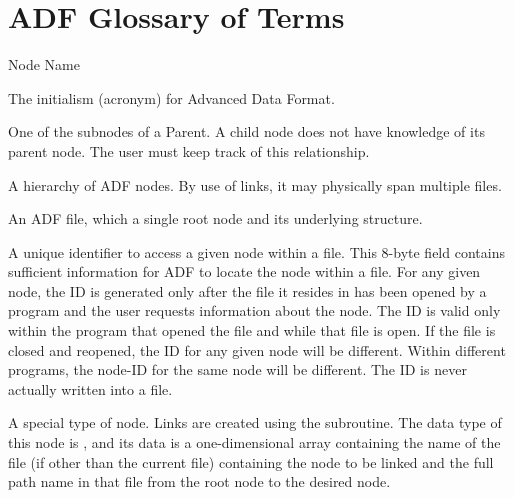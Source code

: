 \section{ADF Glossary of Terms}
\label{s:glossary}
\thispagestyle{plain}

\begin{Ventryi}{Node Name}
\item [ADF]
      The initialism (acronym) for Advanced Data Format.
\item [Child]
      One of the subnodes of a Parent.
      A child node does not have knowledge of its parent node.
      The user must keep track of this relationship.
\item [Database]
      A hierarchy of ADF nodes.
      By use of links, it may physically span multiple files.
\item [File]
      An ADF file, which a single root node and its underlying structure.
\item [ID]
      A unique identifier to access a given node within a file.
      This 8-byte field contains sufficient information for ADF to
      locate the node within a file.
      For any given node, the ID is generated only after the file it
      resides in has been opened by a program and the user requests
      information about the node.
      The ID is valid only within the program that opened the file and
      while that file is open.
      If the file is closed and reopened, the ID for any given node
      will be different.
      Within different programs, the node-ID for the same node will be
      different.
      The ID is never actually written into a file.
\item [Link-Node]
      A special type of node.
      Links are created using the \hyperlink{sub:Link}{}
      subroutine.
      The data type of this node is , and its data is a
      one-dimensional array containing the name of the file (if other
      than the current file) containing the node to be linked and the
      full path name in that file from the root node to the desired
      node.


\end{Ventryi}
